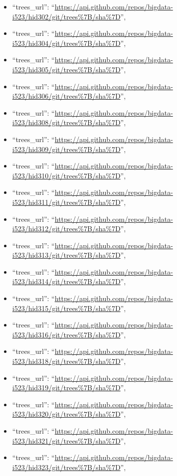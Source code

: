 \begin{itemize}
\item
  ``trees\_url'':
  ``\url{https://api.github.com/repos/bigdata-i523/hid302/git/trees\%7B/sha\%7D}'',
\item
  ``trees\_url'':
  ``\url{https://api.github.com/repos/bigdata-i523/hid304/git/trees\%7B/sha\%7D}'',
\item
  ``trees\_url'':
  ``\url{https://api.github.com/repos/bigdata-i523/hid305/git/trees\%7B/sha\%7D}'',
\item
  ``trees\_url'':
  ``\url{https://api.github.com/repos/bigdata-i523/hid306/git/trees\%7B/sha\%7D}'',
\item
  ``trees\_url'':
  ``\url{https://api.github.com/repos/bigdata-i523/hid308/git/trees\%7B/sha\%7D}'',
\item
  ``trees\_url'':
  ``\url{https://api.github.com/repos/bigdata-i523/hid309/git/trees\%7B/sha\%7D}'',
\item
  ``trees\_url'':
  ``\url{https://api.github.com/repos/bigdata-i523/hid310/git/trees\%7B/sha\%7D}'',
\item
  ``trees\_url'':
  ``\url{https://api.github.com/repos/bigdata-i523/hid311/git/trees\%7B/sha\%7D}'',
\item
  ``trees\_url'':
  ``\url{https://api.github.com/repos/bigdata-i523/hid312/git/trees\%7B/sha\%7D}'',
\item
  ``trees\_url'':
  ``\url{https://api.github.com/repos/bigdata-i523/hid313/git/trees\%7B/sha\%7D}'',
\item
  ``trees\_url'':
  ``\url{https://api.github.com/repos/bigdata-i523/hid314/git/trees\%7B/sha\%7D}'',
\item
  ``trees\_url'':
  ``\url{https://api.github.com/repos/bigdata-i523/hid315/git/trees\%7B/sha\%7D}'',
\item
  ``trees\_url'':
  ``\url{https://api.github.com/repos/bigdata-i523/hid316/git/trees\%7B/sha\%7D}'',
\item
  ``trees\_url'':
  ``\url{https://api.github.com/repos/bigdata-i523/hid318/git/trees\%7B/sha\%7D}'',
\item
  ``trees\_url'':
  ``\url{https://api.github.com/repos/bigdata-i523/hid319/git/trees\%7B/sha\%7D}'',
\item
  ``trees\_url'':
  ``\url{https://api.github.com/repos/bigdata-i523/hid320/git/trees\%7B/sha\%7D}'',
\item
  ``trees\_url'':
  ``\url{https://api.github.com/repos/bigdata-i523/hid321/git/trees\%7B/sha\%7D}'',
\item
  ``trees\_url'':
  ``\url{https://api.github.com/repos/bigdata-i523/hid323/git/trees\%7B/sha\%7D}'',

\end{itemize}
